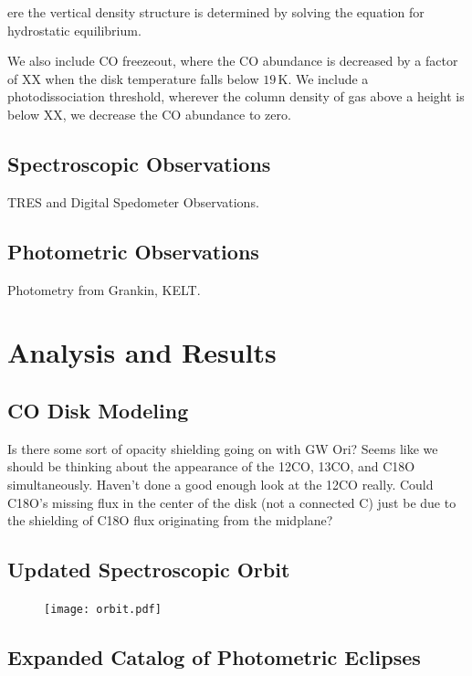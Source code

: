 \documentclass{aastex6}
\begin{document}
ere the vertical density structure is determined by solving the equation for hydrostatic equilibrium.

We also include CO freezeout, where the CO abundance is decreased by a factor of XX when the disk temperature falls below $19\,$K. We include a photodissociation threshold, wherever the column density of gas above a height is below XX, we decrease the CO abundance to zero.

\subsection{Spectroscopic Observations}

TRES and Digital Spedometer Observations.

\subsection{Photometric Observations}

Photometry from Grankin, KELT.

\section{Analysis and Results}

\subsection{CO Disk Modeling}

Is there some sort of opacity shielding going on with GW Ori? Seems like we should be thinking about the appearance of the 12CO, 13CO, and C18O simultaneously. Haven't done a good enough look at the 12CO really. Could C18O's missing flux in the center of the disk (not a connected C) just be due to the shielding of C18O flux originating from the midplane?

\subsection{Updated Spectroscopic Orbit}

\begin{figure}[htb]
\begin{center}
  \texttt{[image: orbit.pdf]}
  \end{center}
\end{figure}

\subsection{Expanded Catalog of Photometric Eclipses}
\end{document}
